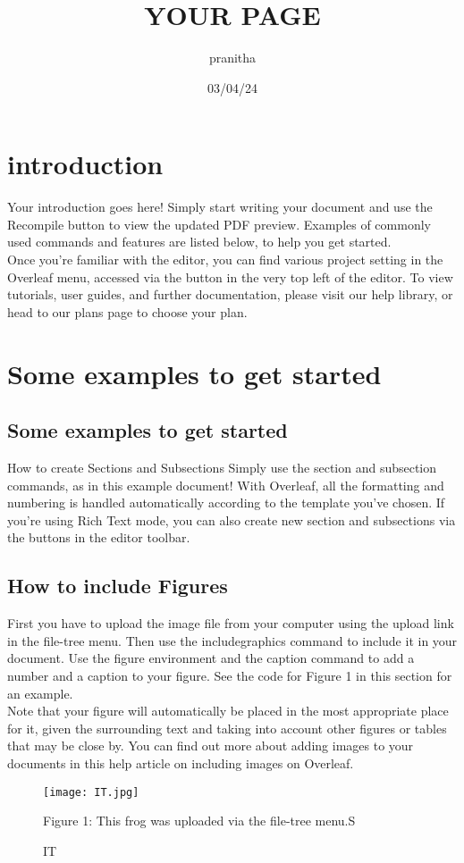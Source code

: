 \documentclass{article}
\title{YOUR PAGE}
\date{03/04/24}
\author{pranitha}
\begin{document}
  \maketitle
\section{introduction}
Your introduction goes here! Simply start writing your document and use the Recompile button to
view the updated PDF preview. Examples of commonly used commands and features are listed below,
to help you get started.\\
Once you’re familiar with the editor, you can find various project setting in the Overleaf menu,
accessed via the button in the very top left of the editor. To view tutorials, user guides, and further
documentation, please visit our help library, or head to our plans page to choose your plan.

\section{Some examples to get started}
\subsection{Some examples to get started}
	How to create Sections and Subsections
	Simply use the section and subsection commands, as in this example document! With Overleaf, all
	the formatting and numbering is handled automatically according to the template you’ve chosen. If
	you’re using Rich Text mode, you can also create new section and subsections via the buttons in the
	editor toolbar.
	
	
	
	
 \subsection{How to include Figures}
 First you have to upload the image file from your computer using the upload link in the file-tree menu.
 Then use the includegraphics command to include it in your document. Use the figure environment
 and the caption command to add a number and a caption to your figure. See the code for Figure 1 in
 this section for an example.\\
 Note that your figure will automatically be placed in the most appropriate place for it, given the
 surrounding text and taking into account other figures or tables that may be close by. You can find
 out more about adding images to your documents in this help article on including images on Overleaf.
 \begin{figure}[htbt]
 	\centering
 	
 	\texttt{[image: IT.jpg]}
 	\caption{IT}
 	\label{example}
 	Figure 1: This frog was uploaded via the file-tree menu.S
 	
 \end{figure}
\end{document}
